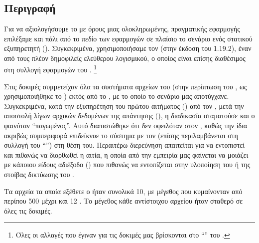 \section{}

\subsection{Περιγραφή}

Για να αξιολογήσουμε το \viofs{} με όρους μιας ολοκληρωμένης, πραγματικής
εφαρμογής επιλέξαμε και πάλι από το πεδίο των  εφαρμογών σε
πλαίσιο  το σενάριο ενός στατικού  εξυπηρετητή ().
Συγκεκριμένα, χρησιμοποιήσαμε τον  \cite{nginx} (στην έκδοση του
1.19.2), έναν από τους πλέον δημοφιλείς  ελεύθερου λογισμικού, ο
οποίος είναι επίσης διαθέσιμος στη συλλογή εφαρμογών του \osv{}.%
\footnote{Όλες οι αλλαγές που έγιναν για τις δοκιμές μας βρίσκονται στο
``''  του .}

Στις δοκιμές συμμετείχαν όλα τα συστήματα αρχείων του \osv{} (στην περίπτωση
του \viofs{}, ως  χρησιμοποιήθηκε το )
εκτός από το , με το οποίο το σενάριο μας αποτύγχανε. Συγκεκριμένα, κατά
την εξυπηρέτηση του πρώτου αιτήματος () από τον , μετά
την αποστολή λίγων αρχικών δεδομένων της απάντησης (), η διαδικασία
σταματούσε και ο \guest{} φαινόταν ``παγωμένος''. Αυτό διαπιστώθηκε ότι δεν
οφειλόταν στον , καθώς την ίδια ακριβώς συμπεριφορά επιδείκνυε το
σύστημα με τον  (επίσης περιλαμβάνεται στη συλλογή του
``'') στη θέση του. Περαιτέρω διερεύνηση απαιτείται για να
εντοπιστεί και πιθανώς να διορθωθεί η αιτία, η οποία από την εμπειρία μας
φαίνεται να μοιάζει με κάποιου είδους αδιέξοδο () που πιθανώς να
εντοπίζεται στην υλοποίηση του  ή της στοίβας δικτύωσης του \osv{}.

Τα αρχεία τα οποία εξέθετε ο  ήταν συνολικά 10, με μέγεθος που
κυμαίνονταν από περίπου 500  μέχρι και 12 . Το μέγεθος κάθε
αντίστοιχου αρχείου ήταν σταθερό σε όλες τις δοκιμές.

